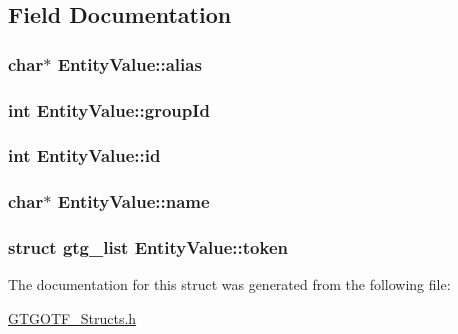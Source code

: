 \subsection{Field Documentation}
\hypertarget{structEntityValue_aa4ce16b0131ebd56e2fbf263f7007c1e}{
\subsubsection[{alias}]{\setlength{\rightskip}{0pt plus 5cm}char$\ast$ Entity\-Value\-::alias}}\label{structEntityValue_aa4ce16b0131ebd56e2fbf263f7007c1e}
\hypertarget{structEntityValue_af9d0d2fd22efd3610ed6fddc23680388}{
\subsubsection[{group\-Id}]{\setlength{\rightskip}{0pt plus 5cm}int Entity\-Value\-::group\-Id}}\label{structEntityValue_af9d0d2fd22efd3610ed6fddc23680388}
\hypertarget{structEntityValue_a61d28bb9506e9f63393b1125360daca1}{
\subsubsection[{id}]{\setlength{\rightskip}{0pt plus 5cm}int Entity\-Value\-::id}}\label{structEntityValue_a61d28bb9506e9f63393b1125360daca1}
\hypertarget{structEntityValue_a5e6e1be50971e3c2547ab66657740c6e}{
\subsubsection[{name}]{\setlength{\rightskip}{0pt plus 5cm}char$\ast$ Entity\-Value\-::name}}\label{structEntityValue_a5e6e1be50971e3c2547ab66657740c6e}
\hypertarget{structEntityValue_a191ba3c755e7cc31ad8b8f2dc8e82303}{
\subsubsection[{token}]{\setlength{\rightskip}{0pt plus 5cm}struct {\bf gtg\-\_\-list} Entity\-Value\-::token}}\label{structEntityValue_a191ba3c755e7cc31ad8b8f2dc8e82303}


The documentation for this struct was generated from the following file\-:\begin{DoxyCompactItemize}
\item 
\hyperlink{GTGOTF__Structs_8h}{G\-T\-G\-O\-T\-F\-\_\-\-Structs.\-h}\end{DoxyCompactItemize}
